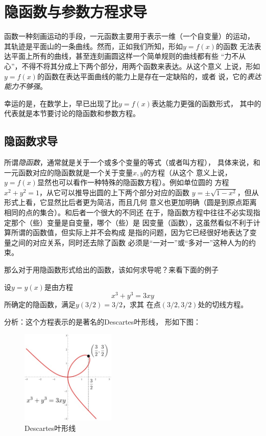 \section{隐函数与参数方程求导}

函数一种刻画运动的手段，一元函数主要用于表示一维（一个自变量）的运动，
其轨迹是平面山的一条曲线。然而，正如我们所知，形如$y=f(x)$的函数
无法表达平面上所有的曲线，甚至连刻画圆这样一个简单规则的曲线都有些
“力不从心”，不得不将其分成上下两个部分，用两个函数来表达。从这个意义
上说，形如$y=f(x)$的函数在表达平面曲线的能力上是存在一定缺陷的，或者
说，它的{\it 表达能力不够强}。

幸运的是，在数学上，早已出现了比$y=f(x)$表达能力更强的函数形式，
其中的代表就是本节要讨论的隐函数和参数方程。

\subsection{隐函数求导}

所谓{\it 隐函数}，通常就是关于一个或多个变量的等式（或者叫方程），
具体来说，和一元函数对应的隐函数就是一个关于变量$x,y$的方程（从这个
意义上说，$y=f(x)$显然也可以看作一种特殊的隐函数方程）。例如单位圆的
方程$x^2+y^2=1$，从它可以推导出圆的上下两个部分对应的函数
$y=\pm\sqrt{1-x^2}$，但从形式上看，它显然比后者更为简洁，而且几何
意义也更加明确（圆是到原点距离相同的点的集合）。和后者一个很大的不同还
在于，隐函数方程中往往不必实现指定那个（些）变量是自变量，哪个（些）是
因变量（函数），这虽然看似不利于计算所谓的函数值，但实际上并不会构成
是指的问题，因为它已经很好地表达了变量之间的对应关系，同时还去除了函数
必须是“一对一”或“多对一”这种人为的约束。

那么对于用隐函数形式给出的函数，该如何求导呢？来看下面的例子

\egz 设$y=y(x)$是由方程
$$x^3+y^3=3xy$$
所确定的隐函数，满足$y(3/2)=3/2$，求其
在点$(3/2,3/2)$处的切线方程。

分析：这个方程表示的是著名的{\kaishu Descartes叶形线}，
形如下图：
\begin{figure}[h]
	\centering
	\includegraphics[width=0.4\textwidth]{./Images/Ch02/x3y33xy.jpg}
	\caption{Descartes叶形线}
	\label{fig:x3y33xy}
\end{figure}

